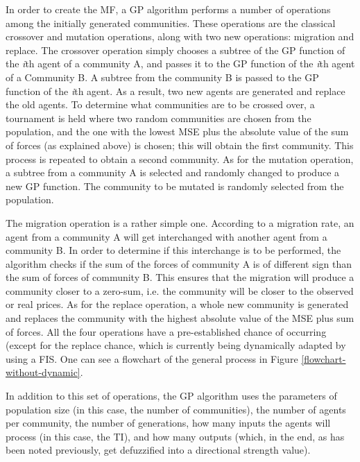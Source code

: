 \documentclass[a4paper,twoside]{article}
\begin{document}
In order to create the MF, a GP algorithm performs a number of
operations among the initially generated communities. These operations
are the classical crossover and mutation operations, along with two
new operations: migration and replace. The crossover operation simply
chooses a subtree of the GP function of the \textit{i}th agent of a
community A, and passes it to the GP function of the \textit{i}th
agent of a Community B. A subtree from the community B is passed to
the GP function of the \textit{i}th agent. As a result, two new agents
are generated and replace the old agents. To determine what
communities are to be crossed over, a tournament is held where two
random communities are chosen from the population, and the one with
the lowest MSE plus the absolute value of the sum of forces (as
explained above)
is chosen; this will obtain the first community. This process is
repeated to obtain a second community. As for the mutation operation,
a subtree from a community A is selected and randomly changed to
produce a new GP function. The community to be mutated is randomly
selected from the population. %

The migration operation is a rather simple one. According to a
migration rate, an agent from a community A will get interchanged
with another agent from a community B. In order to determine if this
interchange is to be performed, the algorithm checks if the sum of the
forces of community A is of different sign than the sum of forces of
community B. This ensures that the migration will produce a community
closer to a zero-sum, i.e. the community will be closer to the
observed or real prices. As for the replace operation, a whole new
community is generated and replaces the community with the highest
absolute value of the MSE plus sum of forces. All the four operations
have a pre-established chance of occurring (except for the replace
chance, which is currently being dynamically adapted by using a FIS.
One can see a flowchart of the general process in Figure
\ref{flowchart-without-dynamic}. %

In addition to this set of operations, the GP algorithm uses the
parameters of population size (in this case, the number of
communities), the number of agents per community, the number of
generations, how many inputs the agents will process (in this case,
the TI), and how many outputs (which, in the end, as has been noted
previously, get defuzzified into a directional strength value). %
\end{document}
